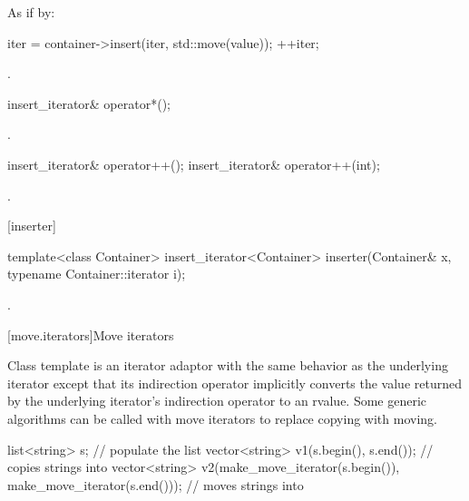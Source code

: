 \begin{itemdescr}
\pnum
\effects
As if by:
\begin{codeblock}
iter = container->insert(iter, std::move(value));
++iter;
\end{codeblock}

\pnum
\returns
{}.
\end{itemdescr}

%
\begin{itemdecl}
insert_iterator& operator*();
\end{itemdecl}

\begin{itemdescr}
\pnum
\returns
{}.
\end{itemdescr}

%
\begin{itemdecl}
insert_iterator& operator++();
insert_iterator& operator++(int);
\end{itemdecl}

\begin{itemdescr}
\pnum
\returns
{}.
\end{itemdescr}

[inserter]{}

%
\begin{itemdecl}
template<class Container>
  insert_iterator<Container> inserter(Container& x, typename Container::iterator i);
\end{itemdecl}

\begin{itemdescr}
\pnum
\returns
{}.
\end{itemdescr}

[move.iterators]{Move iterators}

\pnum
Class template  is an iterator adaptor
with the same behavior as the underlying iterator except that its
indirection operator implicitly converts the value returned by the
underlying iterator's indirection operator to an rvalue.
Some generic algorithms can be called with move iterators to replace
copying with moving.

\pnum
\begin{example}

\begin{codeblock}
list<string> s;
// populate the list 
vector<string> v1(s.begin(), s.end());          // copies strings into 
vector<string> v2(make_move_iterator(s.begin()),
                  make_move_iterator(s.end())); // moves strings into 
\end{codeblock}

\end{example}

